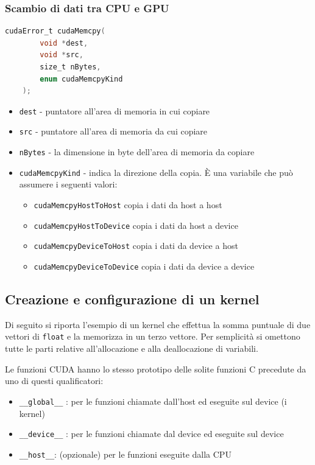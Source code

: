 \subsubsection{Scambio di dati tra CPU e GPU}
\begin{lstlisting}[language=C]
    cudaError_t cudaMemcpy(
        void *dest, 
        void *src, 
        size_t nBytes, 
        enum cudaMemcpyKind
    );
\end{lstlisting}
\begin{itemize}
    \item \texttt{dest} - puntatore all'area di memoria in cui copiare
    \item \texttt{src} - puntatore all'area di memoria da cui copiare
    \item \texttt{nBytes} - la dimensione in byte dell'area di memoria da copiare
    \item \texttt{cudaMemcpyKind} - indica la direzione della copia. È una variabile che può assumere i seguenti valori:
    \begin{itemize}
        \item \texttt{cudaMemcpyHostToHost} copia i dati da host a host
        \item \texttt{cudaMemcpyHostToDevice} copia i dati da host a device
        \item \texttt{cudaMemcpyDeviceToHost} copia i dati da device a host
        \item \texttt{cudaMemcpyDeviceToDevice} copia i dati da device a device
    \end{itemize}
\end{itemize}

\subsection{Creazione e configurazione di un kernel}
\noindent Di seguito si riporta l'esempio di un kernel che effettua la somma puntuale di due vettori di \texttt{float} e la memorizza in un terzo vettore. Per semplicità si omettono tutte le parti relative all'allocazione e alla deallocazione di variabili.

\vspace{0.5cm}
 \label{list: ex01}
\vspace{0.5cm}

\noindent Le funzioni CUDA hanno lo stesso prototipo delle solite funzioni C precedute da uno di questi qualificatori:
\begin{itemize}
    \item \texttt{\_\_global\_\_} : per le funzioni chiamate dall'host ed eseguite sul device (i kernel)
    \item \texttt{\_\_device\_\_} : per le funzioni chiamate dal device ed eseguite sul device
    \item \texttt{\_\_host\_\_}: (opzionale) per le funzioni eseguite dalla CPU
\end{itemize}


